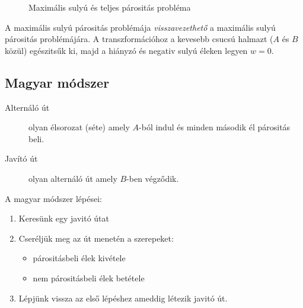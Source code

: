 \begin{figure}[htb]
\caption{Maximális sulyú és teljes párositás probléma}
\label{fig:OptMaxNemEkv}
\centering
{} 
\end{figure}

A maximális sulyú párositás problémája \emph{visszavezethető} a maximális sulyú
párositás problémájára. A transzformációhoz a kevesebb csucsú halmazt ($A$ és
$B$ közül) egészitsűk ki, majd a hiányzó és negativ sulyú éleken legyen $w=0$.

\subsection{Magyar módszer}

\begin{description}
  \item[Alternáló út] olyan élsorozat (séte) amely $A$-ból indul és minden második 
  él párositás beli.
  \item[Javító út] olyan alternáló út amely $B$-ben végződik.  
\end{description}

A magyar módszer lépései:
\begin{enumerate}
  \item Keresünk egy javitó útat
  \item Cseréljük meg az út menetén a szerepeket:
  	\begin{itemize}
  	\item párositásbeli élek kivétele
  	\item nem párositásbeli élek betétele 
	\end{itemize}
  \item Lépjünk vissza az első lépéshez ameddig létezik javitó út.
\end{enumerate}


